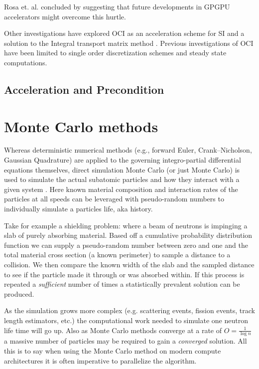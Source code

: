 Rosa et. al. concluded by suggesting that future developments in GPGPU accelerators might overcome this hurtle.

Other investigations have explored OCI as an acceleration scheme for SI \citep{anistratov_iterative_2015, hoagland_hybrid_2021} and a solution to the Integral transport matrix method \citep{raffi2108pidotscom}.
Previous investigations of OCI have been limited to single order discretization schemes and steady state computations.

\subsection{Acceleration and Precondition}



\section {Monte Carlo methods}
Whereas deterministic numerical methods (e.g., forward Euler, Crank--Nicholson, Gaussian Quadrature) are applied to the governing integro-partial differential equations themselves, direct simulation Monte Carlo (or just Monte Carlo) is used to simulate the actual subatomic particles and how they interact with a given system \cite{CompMeth}.
Here known material composition and interaction rates of the particles at all speeds can be leveraged with pseudo-random numbers to individually simulate a particles life, aka history.

Take for example a shielding problem: where a beam of neutrons is impinging a slab of purely absorbing material.
Based off a cumulative probability distribution function we can supply a pseudo-random number between zero and one and the total material cross section (a known perimeter) to sample a distance to a collision.
We then compare the known width of the slab and the sampled distance to see if the particle made it through or was absorbed within. If this process is repeated a \textit{sufficient} number of times a statistically prevalent solution can be produced.

As the simulation grows more complex (e.g. scattering events, fission events, track length estimators, etc.) the computational work needed to simulate one neutron life time will go up.
Also as Monte Carlo methods converge at a rate of $O = \frac{1}{\log{n}}$ a massive number of particles may be required to gain a \textit{converged} solution.
All this is to say when using the Monte Carlo method on modern compute architectures it is often imperative to parallelize the algorithm.


